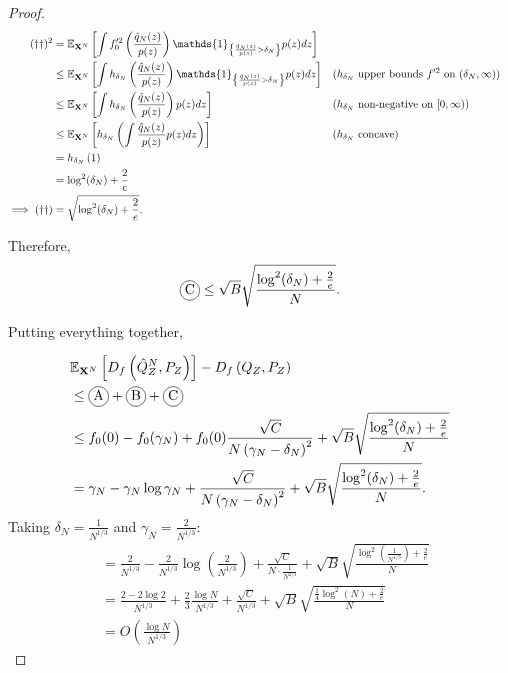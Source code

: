 \begin{proof}
\begin{align*}
    (\dagger\dagger)^2 
    &= \E_{\XN} \left[\int f_0'^2\left(\frac{\hat{q}_N(z)}{p(z)} \right) \mathds{1}_{\left\lbrace \frac{\hat{q}_N(z)}{p(z)} > \delta_N \right\rbrace} p(z) dz \right]
    \\
    &\leq \E_{\XN} \left[ \int h_{\delta_N}\left(\frac{\hat{q}_N(z)}{p(z)} \right) \mathds{1}_{\left\lbrace \frac{\hat{q}_N(z)}{p(z)} > \delta_N \right\rbrace} p(z) dz \right]
    && \text{($h_{\delta_N}$ upper bounds $f'^2$ on $(\delta_N, \infty)$)}
    \\
    &\leq \E_{\XN}\left[ \int h_{\delta_N}\left(\frac{\hat{q}_N(z)}{p(z)} \right) p(z) dz \right]
    && \text{($h_{\delta_N}$ non-negative on $[0, \infty)$)}
    \\
    &\leq \E_{\XN} \left[ h_{\delta_N}\left( \int \frac{\hat{q}_N(z)}{p(z)} p(z) dz \right)  \right]
    && \text{($h_{\delta_N}$ concave)}
    \\
    &=  h_{\delta_N}\left( 1\right) \\
    &= \log^2(\delta_N) + \frac{2}{e} \\
    \implies (\dagger\dagger)&= \sqrt{\log^2(\delta_N) + \frac{2}{e}}.
\end{align*}

Therefore,
\begin{align*}
    \encircle{C} \leq \sqrt{B} \sqrt{\frac{\log^2(\delta_N) + \frac{2}{e}}{N}}.
\end{align*}

Putting everything together,

\begin{align*}
    &\E_{\XN} \left[ D_f\left( \hat{Q}_Z^N , P_Z\right)\right] - D_f\left( Q_{Z} , P_Z\right)\\
    &\leq \encircle{A} + \encircle{B} + \encircle{C} \\
    &\leq f_0(0) - f_0(\gamma_N) + f_0(0) \frac{\sqrt{C}}{N \left( \gamma_N - \delta_N \right)^2} + \sqrt{B} \sqrt{\frac{\log^2(\delta_N) + \frac{2}{e}}{N}}\\
    &= \gamma_N - \gamma_N \log \gamma_N  + \frac{\sqrt{C}}{N \left( \gamma_N - \delta_N \right)^2} + \sqrt{B} \sqrt{\frac{\log^2(\delta_N) + \frac{2}{e}}{N}}.
\end{align*}
Taking $\delta_N = \frac{1}{N^{1/3}}$ and $\gamma_N = \frac{2}{N^{1/3}}$:
\begin{align*}
    &=\frac{2}{N^{1/3}} - \frac{2}{N^{1/3}} \log\left( \frac{2}{N^{1/3}}\right) + \frac{ \sqrt{C} }{N \cdot \frac{1}{N^{2/3}} } + \sqrt{B} \sqrt{\frac{\log^2\left(\frac{1}{N^{1/3}}\right) + \frac{2}{e}}{N}}\\
    &= \frac{ 2 - 2\log2}{N^{1/3}} + \frac{2}{3}\frac{\log N}{N^{1/3}} + \frac{\sqrt{C}}{N^{1/3}} + \sqrt{B} \sqrt{\frac{\frac{1}{4}\log^2\left(N\right) + \frac{2}{e}}{N}} \\
    & = O\left( \frac{\log N}{N^{1/3}}\right)
\end{align*}



\end{proof}
